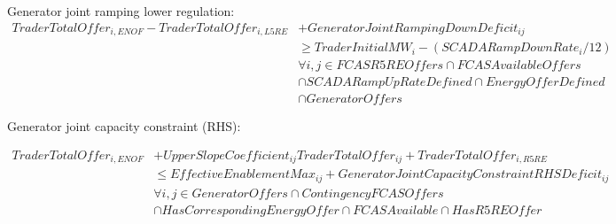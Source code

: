 \documentclass{article}
\begin{document}
Generator joint ramping lower regulation:
\begin{equation}
\begin{split}
TraderTotalOffer_{i,ENOF} - TraderTotalOffer_{i,L5RE} & + GeneratorJointRampingDownDeficit_{ij}\\
& \geq TraderInitialMW_{i} - (SCADARampDownRate_{i} / 12) \\
& \forall i,j \in FCASR5REOffers \cap FCASAvailableOffers \\
& \cap SCADARampUpRateDefined \cap EnergyOfferDefined\\
& \cap GeneratorOffers
\end{split}
\end{equation}

%
%
%
%
%
%
Generator joint  capacity constraint (RHS):

\begin{equation}
\begin{split}
TraderTotalOffer_{i,ENOF} & + UpperSlopeCoefficient_{ij} TraderTotalOffer_{ij} + TraderTotalOffer_{i,R5RE}\\
& \leq EffectiveEnablementMax_{ij} + GeneratorJointCapacityConstraintRHSDeficit_{ij}\\
& \forall i,j \in GeneratorOffers \cap ContingencyFCASOffers\\
& \cap HasCorrespondingEnergyOffer \cap FCASAvailable \cap HasR5REOffer
\end{split}
\end{equation}
\end{document}

